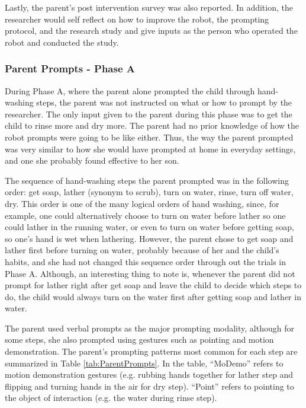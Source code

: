 \documentclass{ut-thesis}
\begin{document}
Lastly, the parent's post intervention survey was also reported.  In addition, the researcher would self reflect on how to improve the robot, the prompting protocol, and the research study and give inputs as the person who operated the robot and conducted the study.

\subsubsection{Parent Prompts - Phase A}
During Phase A, where the parent alone prompted the child through hand-washing steps, the parent was not instructed on what or how to prompt by the researcher.  The only input given to the parent during this phase was to get the child to rinse more and dry more.  The parent had no prior knowledge of how the robot prompts were going to be like either.  Thus, the way the parent prompted was very similar to how she would have prompted at home in everyday settings, and one she probably found effective to her son.

The sequence of hand-washing steps the parent prompted was in the following order: get soap, lather (synonym to scrub), turn on water, rinse, turn off water, dry.  This order is one of the many logical orders of hand washing, since, for example, one could alternatively choose to turn on water before lather so one could lather in the running water, or even to turn on water before getting soap, so one's hand is wet when lathering.  However, the parent chose to get soap and lather first before turning on water, probably because of her and the child's habits, and she had not changed this sequence order through out the trials in Phase A.  Although, an interesting thing to note is, whenever the parent did not prompt for lather right after get soap and leave the child to decide which steps to do, the child would always turn on the water first after getting soap and lather in water.

The parent used verbal prompts as the major prompting modality, although for some steps, she also prompted using gestures such as pointing and motion demonstration.  The parent's prompting patterns most common for each step are summarized in Table \ref{tab:ParentPrompts}.  In the table, ``MoDemo'' refers to motion demonstration gestures (e.g. rubbing hands together for lather step and flipping and turning hands in the air for dry step).  ``Point'' refers to pointing to the object of interaction (e.g. the water during rinse step).
\end{document}
